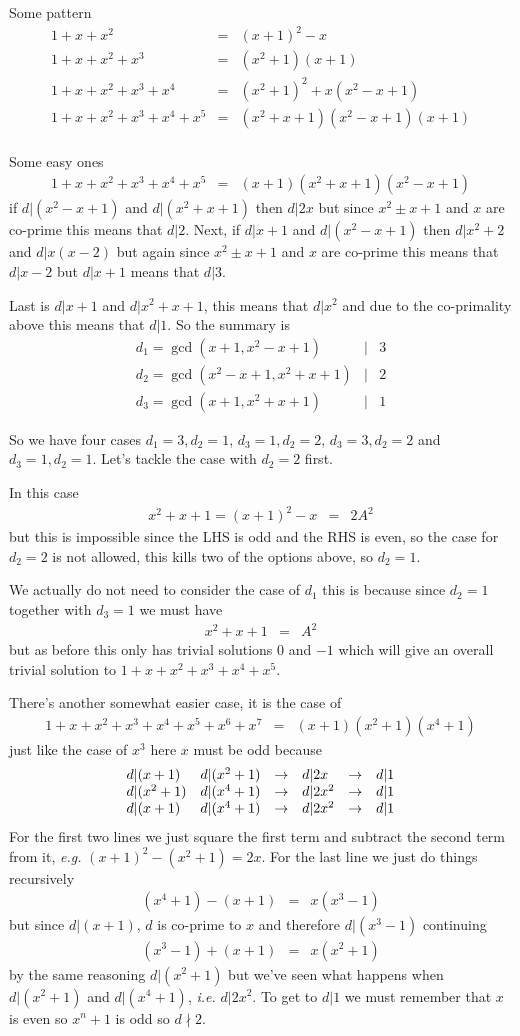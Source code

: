 \documentclass[aps,preprint,preprintnumbers,nofootinbib,showpacs,prd]{revtex4-1}
\newcommand{\ie}{{\it i.e.} }
\newcommand{\eg}{{\it e.g.} }
\newcommand{\nbea}{\begin{eqnarray*}}
\newcommand{\neea}{\end{eqnarray*}}
\begin{document}
Some pattern
%
\nbea
1 + x + x^2 & = & (x+1)^2 - x \\
1 + x + x^2 + x^3 & = & (x^2+1)(x+1) \\
1 + x + x^2 + x^3 + x^4 & = & (x^2+1)^2 + x(x^2 - x + 1) \\
1 + x + x^2 + x^3 + x^4 + x^5 & = & (x^2+x+1)(x^2 - x + 1)(x+1) \\
\neea
%


Some easy ones
%
\nbea
1 + x + x^2 + x^3 + x^4 + x^5 & = & (x +1)(x^2 + x + 1)(x^2 - x + 1) 
\neea
%
if $d|(x^2 - x + 1)$ and $d|(x^2 + x + 1)$ then $d|2x$ but since $x^2 \pm x + 1$ and $x$ are co-prime this means that $d|2$. Next, if $d|x+1$ and $d|(x^2 - x + 1)$ then $d|x^2 + 2$ and $d|x(x - 2)$ but again since $x^2 \pm x + 1$ and $x$ are co-prime this means that $d|x - 2$ but $d|x + 1$ means that $d|3$.

Last is $d|x + 1$ and $d| x^2 + x + 1$, this means that $d|x^2$ and due to the co-primality above this means that $d|1$. So the summary is
%
\nbea
d_1 = \gcd(x + 1, x^2 - x + 1) & | & 3 \\
d_2 = \gcd(x^2 - x + 1, x^2 + x + 1) & | & 2 \\
d_3 = \gcd(x + 1, x^2 + x + 1) & | & 1
\neea
%

So we have four cases $d_1 = 3, d_2 = 1$, $d_3 = 1, d_2 = 2$, $d_3 = 3, d_2 = 2$ and $d_3 = 1, d_2 = 1$. Let's tackle the case with $d_2 = 2$ first.

In this case 
%
\nbea
x^2 + x + 1  = (x+1)^2 - x& = & 2A^2
\neea
%
but this is impossible since the LHS is odd and the RHS is even, so the case for $d_2 = 2$ is not allowed, this kills two of the options above, so $d_2 = 1$.

We actually do not need to consider the case of $d_1$ this is because since $d_2 = 1$ together with $d_3 = 1$ we must have
%
\nbea
x^2 + x + 1 & = & A^2
\neea
%
but as before this only has trivial solutions $0$ and $-1$ which will give an overall trivial solution to $1 + x + x^2 + x^3 + x^4 + x^5$.



There's another somewhat easier case, it is the case of 
%
\nbea
1 + x + x^2 + x^3 + x^4 + x^5 + x^6 + x^7 & = & (x + 1)(x^2 + 1)(x^4 + 1)
\neea
%
just like the case of $x^3$ here $x$ must be odd because
%
\nbea
\begin{array}{l l c l c l}
d|(x + 1) & d|(x^2 + 1) & \to & d|2x  & \to & d|1\\
d|(x^2 + 1) & d|(x^4 + 1) & \to & d|2x^2  & \to & d|1 \\
d|(x + 1) & d|(x^4 + 1) & \to & d|2x^2  & \to & d|1
\end{array}
\neea
%
For the first two lines we just square the first term and subtract the second term from it, \eg $(x+1)^2 - (x^2+1) = 2x$. For the last line we just do things recursively
%
\nbea
(x^4 + 1) - (x + 1) & = & x(x^3 - 1)
\neea
%
but since $d|(x+1)$, $d$ is co-prime to $x$ and therefore $d|(x^3 - 1)$ continuing
%
\nbea
(x^3 - 1) + (x + 1) & = & x(x^2 + 1)
\neea
%
by the same reasoning $d|(x^2 + 1)$ but we've seen what happens when $d|(x^2 + 1)$ and $d|(x^4 + 1)$, \ie $d|2x^2$. To get to $d|1$ we must remember that $x$ is even so $x^n + 1$ is odd so $d\nmid2$.
\end{document}
